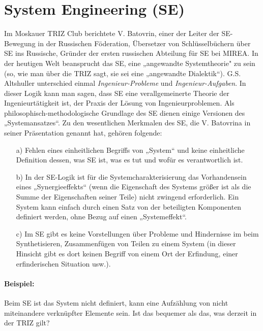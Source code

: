 \documentclass[11pt,a4paper]{article}
\begin{document}
\section{System Engineering (SE)}
Im Moskauer TRIZ Club berichtete V. Batovrin, einer der Leiter der SE-Bewegung
in der Russischen Föderation, Übersetzer von Schlüsselbüchern über SE ins
Russische, Gründer der ersten russischen Abteilung für SE bei MIREA. In der
heutigen Welt beansprucht das SE, eine „angewandte Systemtheorie" zu sein (so,
wie man über die TRIZ sagt, sie sei eine „angewandte Dialektik“).
G.S. Altshuller unterschied einmal \emph{Ingenieur-Probleme} und
\emph{Ingenieur-Aufgaben}. In dieser Logik kann man sagen, dass SE eine
verallgemeinerte Theorie der Ingenieurtätigkeit ist, der Praxis der Lösung von
Ingenieurproblemen. Als philosophisch-methodologische Grundlage des SE dienen
einige Versionen des „Systemansatzes“.  Zu den wesentlichen Merkmalen des SE, 
die V. Batovrina in seiner Präsentation genannt hat, gehören folgende:
\begin{itemize}
\item[a)] Fehlen eines einheitlichen Begriffs von „System“ und keine
  einheitliche Definition dessen, was SE ist, was es tut und wofür es
  verantwortlich ist.
\item[b)] In der SE-Logik ist für die Systemcharakterisierung das
  Vorhandensein eines „Synergieeffekts“ (wenn die Eigenschaft des Systems
  größer ist als die Summe der Eigenschaften seiner Teile) nicht zwingend
  erforderlich. Ein System kann einfach durch einen Satz von der beteiligten
  Komponenten definiert werden, ohne Bezug auf einen „Systemeffekt“.
\item[c)] Im SE gibt es keine Vorstellungen über Probleme und Hindernisse im
  beim Synthetisieren, Zusammenfügen von Teilen zu einem System (in dieser
  Hinsicht gibt es dort keinen Begriff von einem Ort der Erfindung, einer
  erfinderischen Situation usw.).
\end{itemize}
\paragraph{Beispiel:}
Beim SE ist das System nicht definiert, kann eine Aufzählung von nicht
miteinandere verknüpfter Elemente sein. Ist das bequemer als das, was derzeit
in der TRIZ gilt?
\end{document}
